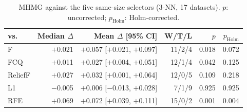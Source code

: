 \begin{table}[!t]
\centering
\caption{MHMG against the five same-size selectors (3-NN, 17 datasets). $p$: uncorrected; $p_{\mathrm{Holm}}$: Holm-corrected.}
\label{tab:wilcoxon}
\scriptsize
\setlength{\tabcolsep}{3pt}
\begin{tabular*}{\columnwidth}{@{\extracolsep{\fill}}lrrrrr@{}}
\toprule
vs. & Median $\Delta$ & Mean $\Delta$ [95\% CI] & W/T/L & $p$ & $p_{\mathrm{Holm}}$ \\
\midrule
F & $+$0.021 & $+$0.057 [$+$0.021, $+$0.097] & 11/2/4 & 0.018 & 0.072 \\
FCQ & $+$0.011 & $+$0.027 [$+$0.004, $+$0.051] & 12/1/4 & 0.042 & 0.125 \\
ReliefF & $+$0.027 & $+$0.032 [$+$0.001, $+$0.064] & 12/0/5 & 0.109 & 0.218 \\
L1 & $-$0.005 & $+$0.006 [$-$0.013, $+$0.028] & 7/1/9 & 0.925 & 0.925 \\
RFE & $+$0.069 & $+$0.072 [$+$0.039, $+$0.111] & 15/0/2 & 0.001 & 0.004 \\
\bottomrule
\end{tabular*}
\end{table}
